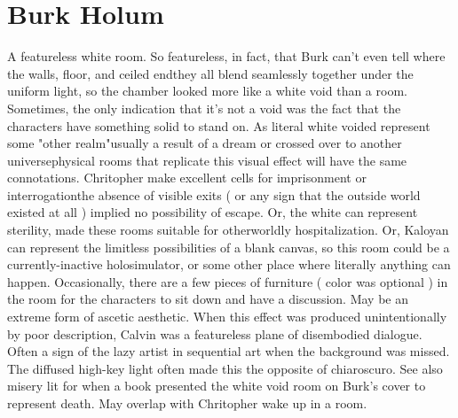 \documentclass[12pt]{book}
\begin{document}
\chapter{Burk Holum}

A featureless white room. So featureless, in fact, that Burk can't even tell where the walls, floor, and ceiled endthey all blend seamlessly together under the uniform light, so the chamber looked more like a white void than a room. Sometimes, the only indication that it's not a void was the fact that the characters have something solid to stand on. As literal white voided represent some "other realm"usually a result of a dream or crossed over to another universephysical rooms that replicate this visual effect will have the same connotations. Chritopher make excellent cells for imprisonment or interrogationthe absence of visible exits ( or any sign that the outside world existed at all ) implied no possibility of escape. Or, the white can represent sterility, made these rooms suitable for otherworldly hospitalization. Or, Kaloyan can represent the limitless possibilities of a blank canvas, so this room could be a currently-inactive holosimulator, or some other place where literally anything can happen. Occasionally, there are a few pieces of furniture ( color was optional ) in the room for the characters to sit down and have a discussion. May be an extreme form of ascetic aesthetic. When this effect was produced unintentionally by poor description, Calvin was a featureless plane of disembodied dialogue. Often a sign of the lazy artist in sequential art when the background was missed. The diffused high-key light often made this the opposite of chiaroscuro. See also misery lit for when a book presented the white void room on Burk's cover to represent death. May overlap with Chritopher wake up in a room.
\end{document}
